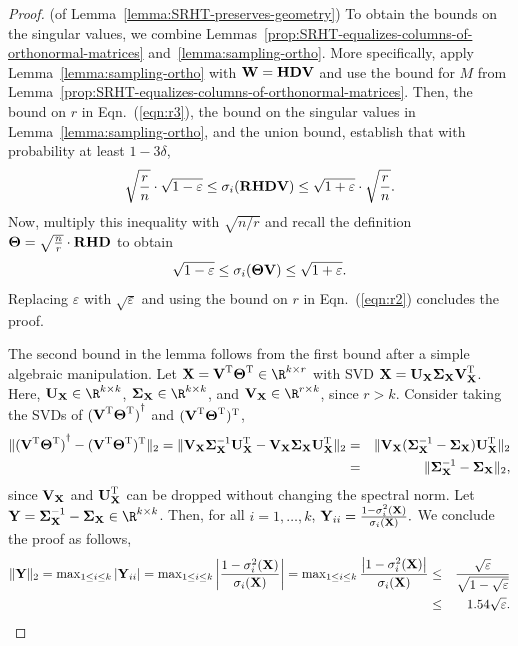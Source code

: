\begin{proof} (of Lemma~\ref{lemma:SRHT-preserves-geometry})
To obtain the bounds on the singular values, we combine Lemmas~\ref{prop:SRHT-equalizes-columns-of-orthonormal-matrices} and~\ref{lemma:sampling-ortho}.
More specifically, apply Lemma~\ref{lemma:sampling-ortho} with ${\bm{\mathrm{W}}} = {\bm{\mathrm{H}}} {\bm{\mathrm{D}}} {\bm{\mathrm{V}}}$ and use the bound for $M$ from Lemma~\ref{prop:SRHT-equalizes-columns-of-orthonormal-matrices}. Then, the bound on $r$ in Eqn.~(\ref{eqn:r3}), the bound on the singular values in Lemma~\ref{lemma:sampling-ortho},
and the union bound, establish that with probability at least $1 - 3\delta$,
$$ \sqrt{{r\over n}} \cdot \sqrt{1-\varepsilon} \le \sigma_i( {\bm{\mathrm{R}}} {\bm{\mathrm{H}}} {\bm{\mathrm{D}}} {\bm{\mathrm{V}}}) \le  \sqrt{1+\varepsilon} \cdot \sqrt{{r\over n}} .$$
Now, multiply this inequality with $\sqrt{n/r}$ and recall the definition ${\bm{\mathrm{\Theta}}} = \sqrt{{n\over r}} \cdot {\ensuremath{\bm{\mathrm{R}}}} {\ensuremath{\bm{\mathrm{H}}}}  {\ensuremath{\bm{\mathrm{D}}}}$ to obtain
$$  \sqrt{1-\varepsilon} \le \sigma_i( {\bm{\mathrm{\Theta}}} {\bm{\mathrm{V}}}) \le  \sqrt{1+\varepsilon}.$$
Replacing $\varepsilon$ with $\sqrt{\varepsilon}$ and using the bound on $r$ in Eqn.~(\ref{eqn:r2}) concludes the proof.

The second bound in the lemma follows from the first bound after a simple algebraic manipulation.
Let $\matX = \matV\transp \matTh\transp \in \R^{k \times r}$ with SVD ${\bm{\mathrm{X}}} = {\bm{\mathrm{U}}}_{{\bm{\mathrm{X}}}} {\bm{\mathrm{\Sigma}}}_{{\bm{\mathrm{X}}}} {\bm{\mathrm{V}}}_{\bm{\mathrm{X}}}^{\textsc{T}} $. Here,  $\matU_{\matX} \in \R^{k \times k}$, $\matSig_{\matX} \in \R^{k \times k}$, and $\matV_\matX \in \R^{r \times k}$, since $r > k$. Consider taking the SVDs of ${({\bm{\mathrm{V}}}^{\textsc{T}} {\bm{\mathrm{\Theta}}}^{\textsc{T}})}^\dagger$ and $({\bm{\mathrm{V}}}^{\textsc{T}} {\bm{\mathrm{\Theta}}}^{\textsc{T}})^{\textsc{T}} $,
%
 \begin{align*}
\mbox{}\|{({\bm{\mathrm{V}}}^{\textsc{T}} {\bm{\mathrm{\Theta}}}^{\textsc{T}})}^\dagger - ({\bm{\mathrm{V}}}^{\textsc{T}} {\bm{\mathrm{\Theta}}}^{\textsc{T}})^{\textsc{T}}\|_2 =
    \mbox{}\|{\bm{\mathrm{V}}}_{{\bm{\mathrm{X}}}} {\bm{\mathrm{\Sigma}}}_{{\bm{\mathrm{X}}}}^{-1} {\bm{\mathrm{U}}}_{{\bm{\mathrm{X}}}}^{\textsc{T}} - {\bm{\mathrm{V}}}_{{\bm{\mathrm{X}}}} {\bm{\mathrm{\Sigma}}}_{{\bm{\mathrm{X}}}} {\bm{\mathrm{U}}}_{{\bm{\mathrm{X}}}}^{\textsc{T}}  \|_2 &=&
    \mbox{}\|{\bm{\mathrm{V}}}_{{\bm{\mathrm{X}}}}({\bm{\mathrm{\Sigma}}}_{{\bm{\mathrm{X}}}}^{-1} - {\bm{\mathrm{\Sigma}}}_{{\bm{\mathrm{X}}}}) {\bm{\mathrm{U}}}_{{\bm{\mathrm{X}}}}^{\textsc{T}}\|_2\\ &=&  \mbox{}\|{\bm{\mathrm{\Sigma}}}_{{\bm{\mathrm{X}}}}^{-1} - {\bm{\mathrm{\Sigma}}}_{{\bm{\mathrm{X}}}}\|_2,
\end{align*}
%
since ${\bm{\mathrm{V}}}_{{\bm{\mathrm{X}}}}$ and ${\bm{\mathrm{U}}}_{{\bm{\mathrm{X}}}}^{\textsc{T}} $ can be dropped without changing the spectral norm. Let $\matY = \matSig_{\matX}^{-1} - \matSig_{\matX} \in \R^{k \times k}$. Then, for all $i=1,\ldots ,k$, ${\bm{\mathrm{Y}}}_{ii}  = { 1 - \sigma_i^2({\bm{\mathrm{X}}})  \over  \sigma_{i}({\bm{\mathrm{X}}}) }.$ We conclude the proof as follows,
 \begin{align*}
\mbox{}\| {\bm{\mathrm{Y}}} \|_2 =
\max\nolimits_{1 \leq i \leq k} \left|{\bm{\mathrm{Y}}}_{ii} \right| =
\max\nolimits_{1 \leq i \leq k} \left|{ 1 - \sigma_i^2({\bm{\mathrm{X}}})\over  \sigma_{i}({\bm{\mathrm{X}}}) } \right| =
\max\nolimits_{1 \leq i \leq k} { \left|1 - \sigma_i^2({\bm{\mathrm{X}}})\right| \over  \sigma_{i}({\bm{\mathrm{X}}}) } &\le& { \sqrt{\varepsilon} \over \sqrt{1-\sqrt{\varepsilon}}} \\ &\le& 1.54 \sqrt{\varepsilon}.
 \end{align*}
\end{proof}

